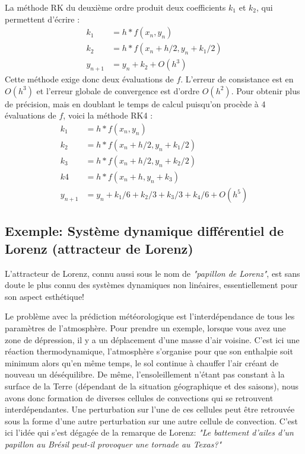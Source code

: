 \documentclass[%
oneside,                 %
final,                   %
10pt]{article}
\begin{document}
La méthode RK du deuxième ordre produit deux coefficients $k_1$ et $k_2$, qui permettent d'écrire :
\begin{align*}
k_1 &= h*f(x_n, y_n) \\
k_2 &= h*f(x_n + h/2, y_n + k_1/2 ) \\
y_{n+1} &= y_n + k_2 + O(h^3)
\end{align*}
Cette méthode exige donc deux évaluations de $f$. L'erreur de consistance est en $O(h^3)$ et l'erreur globale de convergence est d'ordre $O(h^2)$. Pour obtenir plus de précision, mais en doublant le temps de calcul puisqu'on procède à 4 évaluations de $f$, voici la méthode RK4 :
\begin{align*}
k_1 &= h*f(x_n, y_n) \\
k_2 &= h*f(x_n + h/2, y_n + k_1/2 ) \\
k_3 &= h*f(x_n + h/2, y_n + k_2/2 ) \\
k4 &= h*f(x_n + h, y_n + k_3)\\
y_{n+1} &= y_n + k_1/6 + k_2/3 + k_3/3 + k_4/6 + O(h^5)
\end{align*}

\subsection{Exemple: Système dynamique différentiel de Lorenz (attracteur de Lorenz)}
L'attracteur de Lorenz, connu aussi sous le nom de \emph{"papillon de Lorenz"}, est sans doute le plus connu des systèmes dynamiques non linéaires, essentiellement pour son aspect esthétique!

Le problème avec la prédiction météorologique est l'interdépendance de tous les paramètres de l'atmosphère. Pour prendre un exemple, lorsque vous avez une zone de dépression, il y a un déplacement d'une masse d'air voisine. C'est ici une réaction thermodynamique, l'atmosphère s'organise pour que son enthalpie soit minimum alors qu'en même temps, le sol continue à chauffer l'air créant de nouveau un déséquilibre. De même, l'ensoleillement n'étant pas constant à la surface de la Terre (dépendant de la situation géographique et des saisons), nous avons donc formation de diverses cellules de convections qui se retrouvent interdépendantes. Une perturbation sur l'une de ces cellules peut être retrouvée sous la forme d'une autre perturbation sur une autre cellule de convection. C'est ici l'idée qui s'est dégagée de la remarque de Lorenz: \emph{"Le battement d'ailes d'un papillon au Brésil peut-il provoquer une tornade au Texas?"}
\end{document}
